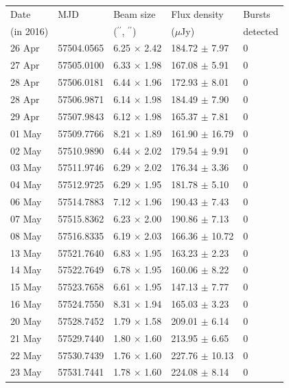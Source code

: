 \documentclass{nature_frb}
\newcommand{\arcsec}{\ensuremath{^{\prime\prime}}}
\begin{document}
\begin{table}
{\label{tab:frblc}}
\medskip
\begin{tabular}{lllll}
\hline
\hline
Date & MJD & Beam size & Flux density & Bursts \\
(in 2016)  & & (\arcsec, \arcsec) & ($\mu$Jy) & detected \\
\hline
26 Apr & 57504.0565  & 6.25 $\times$ 2.42 &184.72  $\pm$  7.97  & 0   \\
27 Apr & 57505.0100  & 6.33 $\times$ 1.98 &167.08  $\pm$  5.91  & 0   \\
28 Apr & 57506.0181  & 6.44 $\times$ 1.96 &172.93  $\pm$  8.01  & 0   \\
28 Apr & 57506.9871  & 6.14 $\times$ 1.98 &184.49  $\pm$  7.90  & 0   \\
29 Apr & 57507.9843  & 6.12 $\times$ 1.98 &165.37  $\pm$  7.81  & 0   \\ \hline
01 May & 57509.7766  & 8.21 $\times$ 1.89 &161.90  $\pm$  16.79  & 0  \\
02 May & 57510.9890  & 6.44 $\times$ 2.02 &179.54  $\pm$  9.91  & 0   \\
03 May & 57511.9746  & 6.29 $\times$ 2.02 &176.34  $\pm$  3.36  & 0   \\
04 May & 57512.9725  & 6.29 $\times$ 1.95 &181.78  $\pm$  5.10  & 0   \\
06 May & 57514.7883  & 7.12 $\times$ 1.96 &190.43  $\pm$  7.43  & 0   \\
07 May & 57515.8362  & 6.23 $\times$ 2.00 &190.86  $\pm$  7.13  & 0   \\
08 May & 57516.8335  & 6.19 $\times$ 2.03 &166.36  $\pm$  10.72  & 0  \\
13 May & 57521.7640  & 6.83 $\times$ 1.95 &163.23  $\pm$  2.23  & 0   \\
14 May & 57522.7649  & 6.78 $\times$ 1.95 &160.06  $\pm$  8.22  & 0   \\
15 May & 57523.7658  & 6.61 $\times$ 1.95 &147.13  $\pm$  7.77  & 0   \\
16 May & 57524.7550  & 8.31 $\times$ 1.94 &165.03  $\pm$  3.23  & 0   \\
20 May & 57528.7452  & 1.79 $\times$ 1.58 &209.01  $\pm$  6.14  & 0   \\
21 May & 57529.7440  & 1.80 $\times$ 1.60 &213.95  $\pm$  6.65  & 0   \\
22 May & 57530.7439  & 1.76 $\times$ 1.60 &227.76  $\pm$  10.13  & 0  \\
23 May & 57531.7441  & 1.78 $\times$ 1.60 &224.08  $\pm$  8.14  & 0   \\

\end{tabular}
\end{table}
\end{document}
